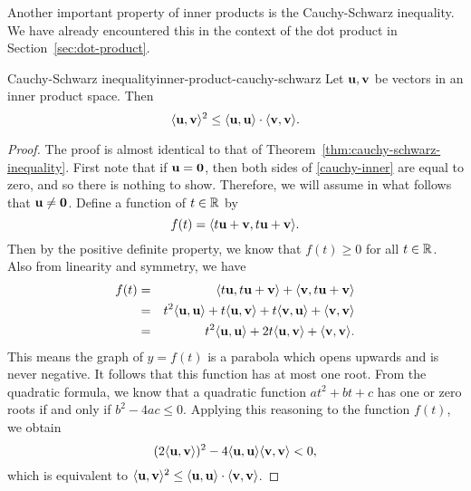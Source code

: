 Another important property of inner products is the Cauchy-Schwarz
inequality. We have already encountered this in the context of the dot
product in Section~\ref{sec:dot-product}.

\begin{theorem}{Cauchy-Schwarz inequality}{inner-product-cauchy-schwarz}
  Let $\mbox{\bf u},\mbox{\bf v}$ be vectors in an inner product space. Then%
  \begin{equation}\label{cauchy-inner}
    \langle\mbox{\bf u},\mbox{\bf v}\rangle^2
    \leq \langle\mbox{\bf u},\mbox{\bf u}\rangle \cdot \langle\mbox{\bf v},\mbox{\bf v}\rangle.
  \end{equation}
\end{theorem}

\begin{proof}
  The proof is almost identical to that of
  Theorem~\ref{thm:cauchy-schwarz-inequality}.  First note that if
  $\mbox{\bf u}=\mbox{\bf 0}$, then both sides of {\eqref{cauchy-inner}} are
  equal to zero, and so there is nothing to show. Therefore, we will
  assume in what follows that $\mbox{\bf u}\neq \mbox{\bf 0}$.  Define a
  function of $t\in \mathbb{R}$ by
  \begin{equation*}
    f(t) = \langle t\mbox{\bf u}+\mbox{\bf v}, t\mbox{\bf u}+ \mbox{\bf v}\rangle.
  \end{equation*}
  Then by the positive definite property, we know that $f(t)\geq 0$
  for all $t\in \mathbb{R}$.  Also from linearity and symmetry, we have
  \begin{eqnarray*}
    f(t) &=& \langle t\mbox{\bf u}, t\mbox{\bf u}+\mbox{\bf v}\rangle +
             \langle\mbox{\bf v}, t\mbox{\bf u}+\mbox{\bf v}\rangle \\
         &=& t^2\langle\mbox{\bf u}, \mbox{\bf u}\rangle+t\langle\mbox{\bf u}, \mbox{\bf v}\rangle + t\langle\mbox{\bf v}, \mbox{\bf u}\rangle+
             \langle\mbox{\bf v}, \mbox{\bf v}\rangle \\
         &=&t^2\langle\mbox{\bf u},\mbox{\bf u}\rangle+2t\langle\mbox{\bf u}, \mbox{\bf v}\rangle
             + \langle\mbox{\bf v}, \mbox{\bf v}\rangle.
  \end{eqnarray*}
  This means the graph of $y=f(t)$ is a parabola which opens upwards
  and is never negative. It follows that this function has at most one
  root. From the quadratic formula, we know that a quadratic function
  $at^2+bt+c$ has one or zero roots if and only if $b^2-4ac\leq
  0$. Applying this reasoning to the function $f(t)$, we obtain
  \begin{equation*}
    (2\langle\mbox{\bf u}, \mbox{\bf v}\rangle)^2
    - 4\langle\mbox{\bf u},\mbox{\bf u}\rangle\langle\mbox{\bf v},\mbox{\bf v}\rangle < 0,
  \end{equation*}
  which is equivalent to
  $\langle\mbox{\bf u},\mbox{\bf v}\rangle^2 \leq \langle\mbox{\bf u},\mbox{\bf u}\rangle \cdot
  \langle\mbox{\bf v},\mbox{\bf v}\rangle$.
\end{proof}

